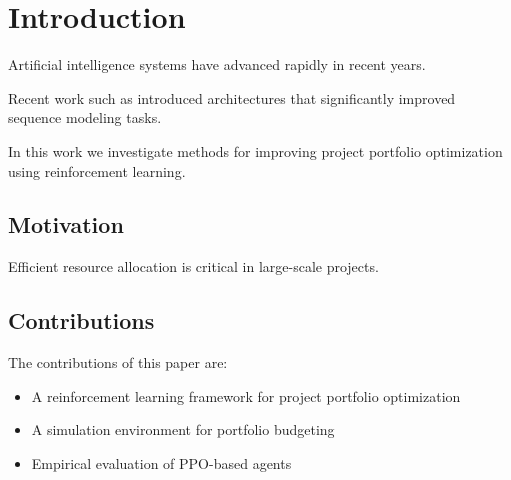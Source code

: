 \section{Introduction}

Artificial intelligence systems have advanced rapidly in recent years.

Recent work such as  introduced architectures
that significantly improved sequence modeling tasks.

In this work we investigate methods for improving project portfolio
optimization using reinforcement learning.

\subsection{Motivation}

Efficient resource allocation is critical in large-scale projects.

\subsection{Contributions}

The contributions of this paper are:

\begin{itemize}
\item A reinforcement learning framework for project portfolio optimization
\item A simulation environment for portfolio budgeting
\item Empirical evaluation of PPO-based agents
\end{itemize}
